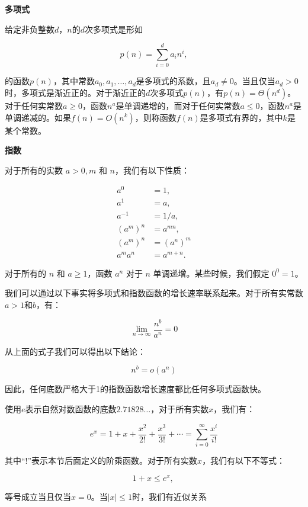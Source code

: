 \documentclass[lang=cn,newtx,10pt,scheme=chinese]{elegantbook}
\begin{document}
\textbf{多项式}

给定非负整数$d$，$n$的$d$次多项式是形如

$$
p(n)=\sum_{i=0}^d a_i n^i,
$$

的函数$p(n)$，其中常数$a_0, a_1, \ldots, a_d$是多项式的系数，且$a_d \neq 0$。当且仅当$a_d>0$时，多项式是渐近正的。对于渐近正的$d$次多项式$p(n)$，有$p(n)=\Theta\left(n^d\right)$。对于任何实常数$a \geq 0$，函数$n^a$是单调递增的，而对于任何实常数$a \leq 0$，函数$n^a$是单调递减的。如果$f(n)=O\left(n^k\right)$，则称函数$f(n)$是多项式有界的，其中$k$是某个常数。

\textbf{指数}

对于所有的实数 $a>0, m$ 和 $n$，我们有以下性质：

$$
\begin{aligned}
a^0 & =1, \\
a^1 & =a, \\
a^{-1} & =1 / a, \\
\left(a^m\right)^n & =a^{m n}, \\
\left(a^m\right)^n & =\left(a^n\right)^m \\
a^m a^n & =a^{m+n} .
\end{aligned}
$$

对于所有的 $n$ 和 $a \geq 1$，函数 $a^n$ 对于 $n$ 单调递增。某些时候，我们假定 $0^0=1$。

我们可以通过以下事实将多项式和指数函数的增长速率联系起来。对于所有实常数$a>1$和$b$，有：

$$
\lim _{n \rightarrow \infty} \frac{n^b}{a^n}=0
$$

从上面的式子我们可以得出以下结论：

\begin{equation}
n^b=o\left(a^n\right)
\end{equation}

因此，任何底数严格大于1的指数函数增长速度都比任何多项式函数快。

使用$e$表示自然对数函数的底数$2.71828 \ldots$，对于所有实数$x$，我们有：

$$
e^x=1+x+\frac{x^2}{2 !}+\frac{x^3}{3 !}+\cdots=\sum_{i=0}^{\infty} \frac{x^i}{i !}
$$

其中``!''表示本节后面定义的阶乘函数。对于所有实数$x$，我们有以下不等式：

\begin{equation}
1+x \leq e^x \text {, }
\end{equation}

等号成立当且仅当$x=0$。当$|x| \leq 1$时，我们有近似关系
\end{document}
